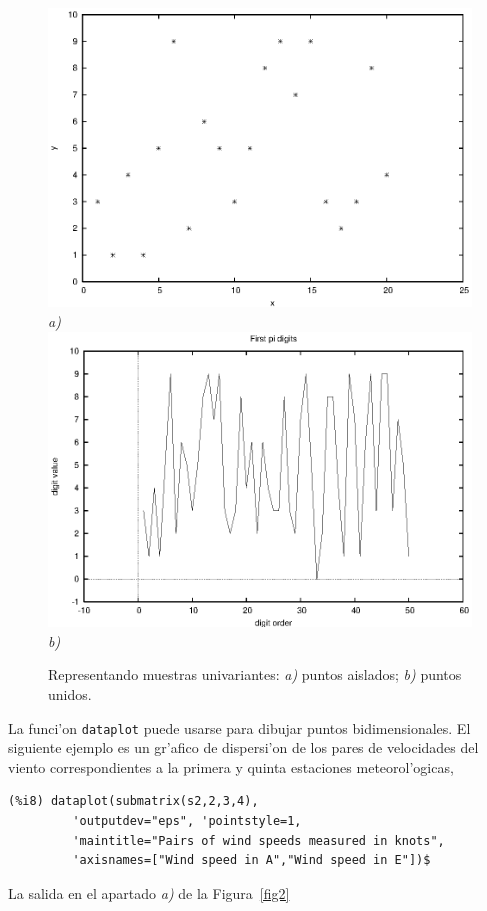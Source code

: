 \documentclass[spanish,12pt,a4paper]{article}
\begin{document}
\begin{description}
\begin{figure}
\begin{center}
\includegraphics[scale=1.0]{dataplot1.eps} \\
\emph{a)} \\ 
\includegraphics[scale=1.0]{dataplot2.eps} \\
\emph{b)} \\
\caption{Representando muestras univariantes: \emph{a)} puntos aislados; \emph{b)} puntos unidos.}
\label{fig1}
\end{center}
\end{figure}

La funci'on \verb|dataplot| puede usarse para dibujar puntos bidimensionales. El siguiente ejemplo es un gr'afico de dispersi'on de los pares de velocidades del viento correspondientes a la primera y quinta estaciones meteorol'ogicas,
\begin{verbatim}
(%i8) dataplot(submatrix(s2,2,3,4),
         'outputdev="eps", 'pointstyle=1,
         'maintitle="Pairs of wind speeds measured in knots",
         'axisnames=["Wind speed in A","Wind speed in E"])$
\end{verbatim}
La salida en el apartado \emph{a)} de la Figura~\ref{fig2}


\end{description}
\end{document}
